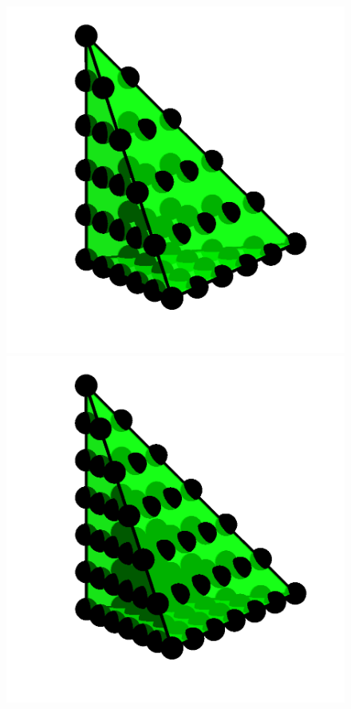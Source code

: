 \begin{figure}
{   \includegraphics[width=\threefigsfull]{chapters/kirby-6/png/CG5_3d.png}
   \includegraphics[width=\threefigsfull]{chapters/kirby-6/png/CG6_3d.png}}
\end{figure}




